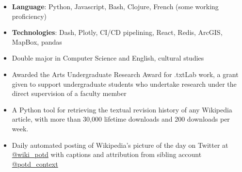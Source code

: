 \begin{itemize}
\item \textbf{Language}: Python, Javascript, Bash, Clojure, French (some working proficiency)
\item \textbf{Technologies}: Dash, Plotly, CI/CD pipelining, React, Redis, ArcGIS, MapBox, pandas
\end{itemize}

\begin{itemize}
\item Double major in Computer Science and English, cultural studies
\item Awarded the Arts Undergraduate Research Award for .txtLab work, a grant given to support undergraduate students who undertake research under the direct supervision of a faculty member
\end{itemize}

\begin{itemize}
\item A Python tool for retrieving the textual revision history of any Wikipedia article, with more than 30,000 lifetime downloads and 200 downloads per week.
\end{itemize}
\begin{itemize}
\item Daily automated posting of Wikipedia's picture of the day on Twitter at \href{http://twitter.com/wiki_potd}{@wiki\_potd} with captions and attribution from sibling account \href{http://twitter.com/wiki_potd}{@potd\_context}
\end{itemize}


